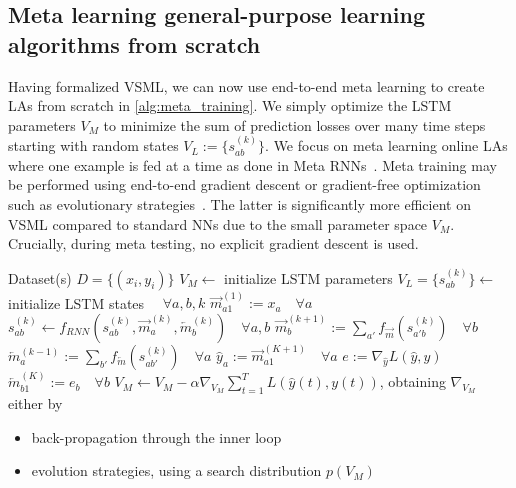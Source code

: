 \documentclass{article}
\newcommand{\principle}{VSML}
\newcommand{\fmsg}{f_{\overrightarrow m}}
\newcommand{\bmsg}{f_{\overleftarrow m}}
\newcommand{\sfmsg}{\overrightarrow m}
\newcommand{\sbmsg}{\overleftarrow m}
\begin{document}
\subsection{Meta learning general-purpose learning algorithms from scratch}\label{sec:meta-scratch}

Having formalized {\principle}, we can now use end-to-end meta learning to create LAs from scratch in \autoref{alg:meta_training}.
We simply optimize the LSTM parameters $V_M$ to minimize the sum of prediction losses over many time steps starting with random states $V_L := \{s_{ab}^{(k)}\}$.
We focus on meta learning online LAs where one example is fed at a time as done in Meta RNNs~\citep{Hochreiter2001,Wang2016,Duan2016}.
Meta training may be performed using end-to-end gradient descent or gradient-free optimization such as evolutionary strategies~\citep{Wierstra2011,Salimans2017}.
The latter is significantly more efficient on VSML compared to standard NNs due to the small parameter space $V_M$.
Crucially, during meta testing, no explicit gradient descent is used.

\begin{algorithm}[H]
    \centering	
    \begin{algorithmic}	
        \Require Dataset(s) $D = \{(x_i, y_i)\}$
        \State $V_M \leftarrow$ initialize LSTM parameters
         
            \State $V_L = \{s_{ab}^{(k)}\} \leftarrow$ initialize LSTM states $\quad \forall a,b,k$
             
                \State $\sfmsg^{(1)}_{a1} := x_a \quad \forall a$ 
                 
                    \State $s_{ab}^{(k)} \leftarrow f_{RNN}(s_{ab}^{(k)}, \sfmsg_a^{(k)}, \sbmsg_b^{(k)}) \quad \forall a,b$ 
                    \State $\sfmsg_b^{(k+1)} := \sum_{a'} \fmsg(s_{a'b}^{(k)}) \quad \forall b$ 
                    \State $\sbmsg_a^{(k-1)} := \sum_{b'} \bmsg(s_{ab'}^{(k)}) \quad \forall a$ 
                \EndFor
                \State $\hat y_a := \sfmsg_{a1}^{(K+1)} \quad \forall a$ 
                \State $e := \nabla_{\hat y} L(\hat y, y)$ 
                \State $\sbmsg_{b1}^{(K)} := e_b \quad \forall b$ 
            \EndFor
            \State $V_M \leftarrow V_M - \alpha \nabla_{V_M} \sum_{t=1}^{T} L(\hat y(t), y(t))$, obtaining $\nabla_{V_M}$ either by
            \begin{itemize}
                \item back-propagation through the inner loop
                \item evolution strategies, using a search distribution $p(V_M)$
            \end{itemize}
        \EndWhile	
    \end{algorithmic}	
    \caption{{\principle}: Meta Training}\label{alg:meta_training}
\end{algorithm}
\end{document}
